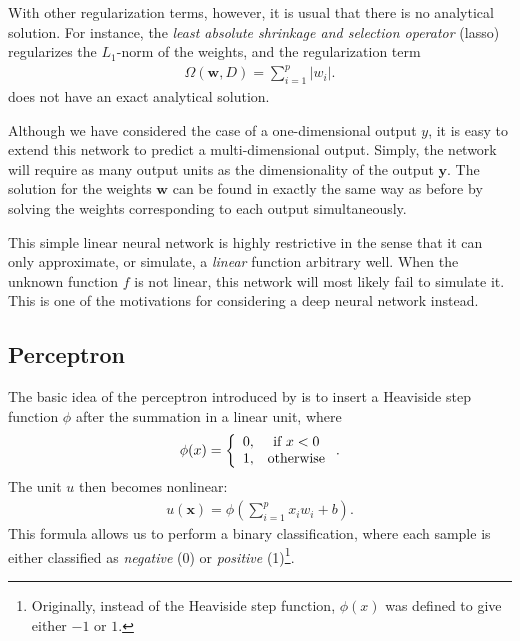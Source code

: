 \documentclass[dissertation,nocontribution,draft*]{aaltoseries}
\newcommand{\vect}[1]{\mathbf{#1}}
\newcommand{\vx}[0]{\vect{x}}
\newcommand{\vy}[0]{\vect{y}}
\newcommand{\vw}[0]{\vect{w}}
\begin{document}
With other regularization terms, however, it is usual that
there is no analytical solution.  For instance, the
\textit{least absolute shrinkage and selection operator}
(lasso) \citep{Tibshirani1994} regularizes the
$L_1$-norm of the weights, and the regularization term 
\begin{align*}
    \Omega(\vw, D) = \sum_{i=1}^p |w_i|.
\end{align*}
does not have an exact analytical solution.

Although we have considered the case of a one-dimensional
output $y$, it is easy to extend this network to predict a
multi-dimensional output. Simply, the network will require
as many output units as the dimensionality of the
output $\vy$. The solution for the weights $\vw$ can be
found in exactly the same way as before by solving the weights
corresponding to each output simultaneously.

This simple linear neural network is highly restrictive in
the
sense that it can only approximate, or simulate, a
\textit{linear} function arbitrary well. When the unknown
function $f$ is not linear, this network will most likely fail
to simulate it.  This is one of the motivations for
considering a deep neural network instead.


\subsection{Perceptron}
\label{sec:perceptron}

The basic idea of the perceptron introduced by
\citet{Rosenblatt1958} is to insert a Heaviside step
function $\phi$ after the summation in a linear unit, where
\begin{align}
    \label{eq:heaviside_func}
    \phi(x) = \left\{ 
    \begin{array}{c c}
        0, &\text{if }x < 0 \\
        1, &\text{otherwise}
    \end{array}
    \right..
\end{align}
The unit $u$ then becomes nonlinear:
\begin{align}
    \label{eq:nonlinear_unit1}
    u(\vx) = \phi\left( 
    \sum_{i=1}^p x_i w_i + b
    \right).
\end{align}
This formula allows us to perform a binary classification,
where each sample is either classified as \textit{negative}
(0) or \textit{positive} (1)\footnote{Originally, instead of
the Heaviside step function, $\phi(x)$ was defined to give
either $-1$ or $1$.}.
\end{document}

